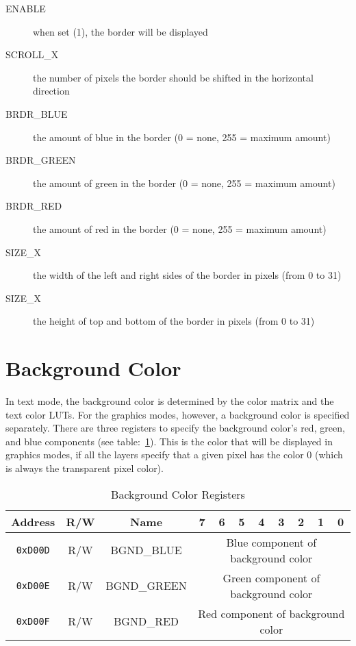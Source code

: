 \begin{description}
    \item[ENABLE] when set (1), the border will be displayed

    \item[SCROLL\_X] the number of pixels the border should be shifted in the horizontal direction

    \item[BRDR\_BLUE] the amount of blue in the border (0 = none, 255 = maximum amount)

    \item[BRDR\_GREEN] the amount of green in the border (0 = none, 255 = maximum amount)

    \item[BRDR\_RED] the amount of red in the border (0 = none, 255 = maximum amount)

    \item[SIZE\_X] the width of the left and right sides of the border in pixels (from 0 to 31)

    \item[SIZE\_X] the height of top and bottom of the border in pixels (from 0 to 31)
\end{description}

\section*{Background Color}

In text mode, the background color is determined by the color matrix and the text color LUTs. For the graphics modes, however, a background color is specified separately. There are three registers to specify the background color's red, green, and blue components (see table:~\ref{tab:back_reg}). This is the color that will be displayed in graphics modes, if all the layers specify that a given pixel has the color 0 (which is always the transparent pixel color).

\begin{table}[ht]
    \begin{center}
        \begin{tabular}{|c|c|c|c|c|c|c|c|c|c|c|} \hline
            Address & R/W & Name & 7 & 6 & 5 & 4 & 3 & 2 & 1 & 0 \\\hline\hline
            \verb+0xD00D+ & R/W & BGND\_BLUE & \multicolumn{8}{|c|}{Blue component of background color} \\ \hline
            \verb+0xD00E+ & R/W & BGND\_GREEN & \multicolumn{8}{|c|}{Green component of background color} \\ \hline
            \verb+0xD00F+ & R/W & BGND\_RED & \multicolumn{8}{|c|}{Red component of background color} \\ \hline
        \end{tabular}
    \end{center}
    \caption{Background Color Registers}
    \label{tab:back_reg}
\end{table}

